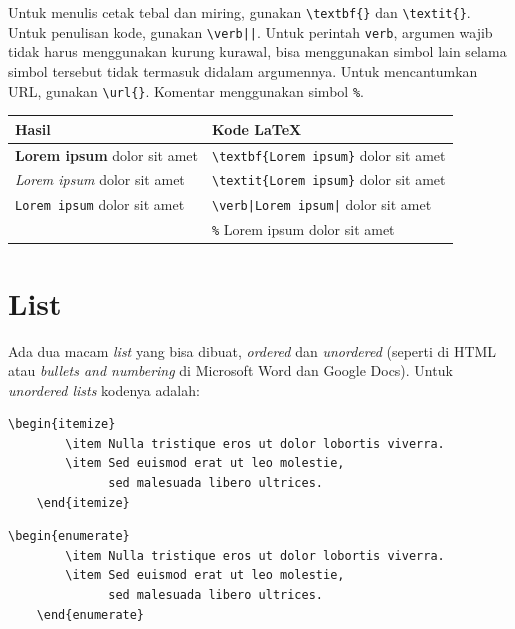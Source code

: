 Untuk menulis cetak tebal dan miring, gunakan \verb|\textbf{}| dan \verb|\textit{}|. Untuk penulisan kode, gunakan \verb/\verb||/. Untuk perintah \texttt{verb}, argumen wajib tidak harus menggunakan kurung kurawal, bisa menggunakan simbol lain selama simbol tersebut tidak termasuk didalam argumennya. Untuk mencantumkan URL, gunakan \verb|\url{}|. Komentar menggunakan simbol \verb|%|.

\begin{table}[H]
    \centering
    \begin{tabular}{l  l}
        \toprule
        Hasil & Kode LaTeX \\
        \midrule
        \textbf{Lorem ipsum} dolor sit amet & \verb|\textbf{Lorem ipsum}| dolor sit amet \\
        \textit{Lorem ipsum} dolor sit amet & \verb|\textit{Lorem ipsum}| dolor sit amet \\
        \verb|Lorem ipsum| dolor sit amet & \verb[\verb|Lorem ipsum|[ dolor sit amet \\
         & \verb[%[ Lorem ipsum dolor sit amet \\
        \bottomrule
    \end{tabular}
\end{table}

\section{List}

Ada dua macam \textit{list} yang bisa dibuat, \textit{ordered} dan \textit{unordered} (seperti di HTML atau \textit{bullets and numbering} di Microsoft Word dan Google Docs). Untuk \textit{unordered lists} kodenya adalah: 

\begin{lstlisting}[caption={Kode Latex untuk \textit{unordered list}}]
    \begin{itemize}
        \item Nulla tristique eros ut dolor lobortis viverra.
        \item Sed euismod erat ut leo molestie, 
              sed malesuada libero ultrices.
    \end{itemize}
\end{lstlisting}

\begin{lstlisting}[caption={Kode Latex untuk \textit{ordered list}}]
    \begin{enumerate}
        \item Nulla tristique eros ut dolor lobortis viverra.
        \item Sed euismod erat ut leo molestie, 
              sed malesuada libero ultrices.
    \end{enumerate}
\end{lstlisting}


